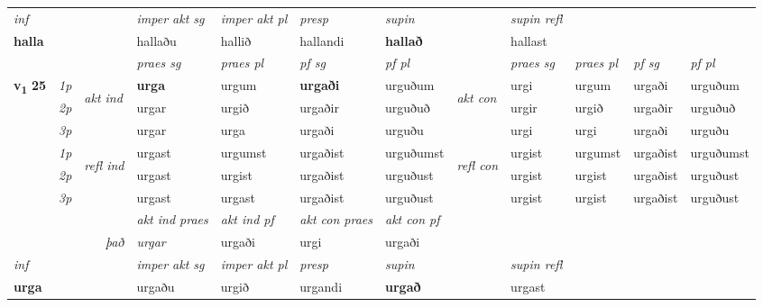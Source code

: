 \begin{longtable}[l]{X>{\footnotesize\itshape}llXXXXlXXXX}
\cmidrule{4-7}
   {\textit{inf}} & &  & \textit{imper akt sg} & \textit{imper akt pl}   & \textit{presp} & \textit{supin} && \textit{supin refl}  \\*
  {\textbf{halla}} & && hallaðu  & hallið   & hallandi &  \textbf{hallað} && hallast  \\*

\midrule

 & &   & \textit{praes sg}  & \textit{praes pl}    & \textit{ pf sg} & \textit{pf pl} & & \textit{praes sg}  & \textit{praes pl}    & \textit{pf sg} & \textit{pf pl }  \\ \cmidrule{4-7} \cmidrule{9-12}
 \multirow{2}{*}{{{\textbf{v{\textsubscript{1}}} \Large{\textbf{25}}}}}  & 1p & \multirow{3}{*}{\begin{turn}{90}\textit{akt ind}\end{turn}} & \textbf{urga} & urgum & \textbf{urgaði} & urguðum & \multirow{3}{*}{\begin{turn}{90}\textit{akt con}\end{turn}} &urgi & urgum & urgaði & urguðum\\*
 & 2p &  &  urgar  & urgið & urgaðir & urguðuð & & urgir & urgið & urgaðir & urguðuð \\*
 & 3p &  & urgar & urga & urgaði & urguðu & & urgi & urgi& urgaði & urguðu \\*
\cmidrule{4-7} \cmidrule{9-12}
 & 1p & \multirow{3}{*}{\begin{turn}{90}\textit{refl ind}\end{turn}}  & urgast & urgumst & urgaðist & urguðumst & \multirow{3}{*}{\begin{turn}{90}\textit{refl con}\end{turn}}  &urgist & urgumst & urgaðist & urguðumst \\*
 & 2p &  & urgast & urgist & urgaðist & urguðust & &urgist & urgist & urgaðist & urguðust \\*
 & 3p  & & urgast & urgast & urgaðist & urguðust & & urgist & urgist& urgaðist & urguðust \\*
\cmidrule{4-7} \cmidrule{9-12}

   && &  \textit{akt ind praes} & \textit{akt ind pf} & \textit{akt con praes} & \textit{akt con pf} \\*
\multicolumn{3}{r}{\textit{það}} & urgar & urgaði & urgi & urgaði \\*

\cmidrule{4-7}
   {\textit{inf}} & &  & \textit{imper akt sg} & \textit{imper akt pl}   & \textit{presp} & \textit{supin} && \textit{supin refl}  \\*
  {\textbf{urga}} & && urgaðu  & urgið   & urgandi &  \textbf{urgað} && urgast  \\*


\end{longtable}
